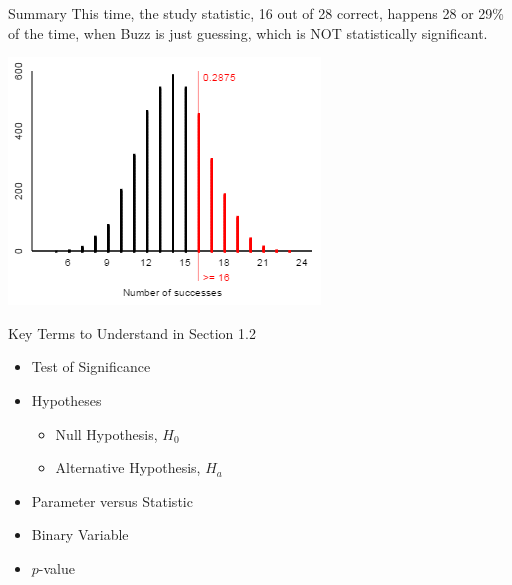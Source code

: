 \documentclass[13pt]{beamer}
\begin{document}
\begin{frame}{Summary}
This time, the study statistic, 16 out of 28 correct, happens 28 or 29\% of the time, when Buzz is just guessing, which is NOT statistically significant.
\begin{center}
\includegraphics[width = 2.5 in]{dolphindistribution2.PNG}
\end{center}
\end{frame}
\begin{frame}{Key Terms to Understand in Section 1.2}
\begin{multicols}{2}
\begin{itemize}
	\item Test of Significance
    \item Hypotheses
    \begin{itemize}
        \item Null Hypothesis, $H_0$
        \item Alternative Hypothesis, $H_a$
    \end{itemize}
    \item Parameter versus Statistic
    \item Binary Variable
    \item $p$-value
\end{itemize}
\end{multicols}
\end{frame}
\end{document}
